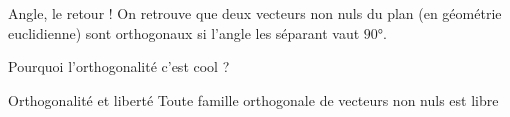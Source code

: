 \documentclass{classe}
\begin{document}
\begin{remarque}{Angle, le retour !}{}
	On retrouve que deux vecteurs non nuls du plan (en géométrie euclidienne) sont orthogonaux si l'angle les séparant vaut $90$°.
\end{remarque}

Pourquoi l'orthogonalité c'est cool ?

\begin{théorème}{Orthogonalité et liberté}{}
Toute famille orthogonale de vecteurs non nuls est libre
\end{théorème}

\end{document}
